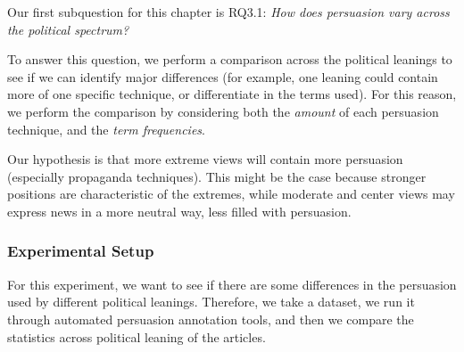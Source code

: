 Our first subquestion for this chapter is RQ3.1: \emph{How does persuasion vary across the political spectrum?}

To answer this question, we perform a comparison across the political leanings to see if we can identify major differences (for example, one leaning could contain more of one specific technique, or differentiate in the terms used).
For this reason, we perform the comparison by considering both the \emph{amount} of each persuasion technique, and the \emph{term frequencies}.



Our hypothesis is that more extreme views will contain more persuasion (especially propaganda techniques).
This might be the case because stronger positions are characteristic of the extremes, while moderate and center views may express news in a more neutral way, less filled with persuasion.

\subsubsection{Experimental Setup}

For this experiment, we want to see if there are some differences in the persuasion used by different political leanings. Therefore, we take a dataset, we run it through automated persuasion annotation tools, and then we compare the statistics across political leaning of the articles.

